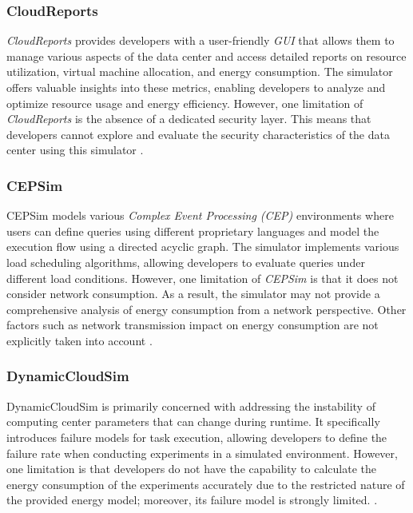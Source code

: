{\subsubsection*{CloudReports}
\emph{CloudReports} \cite{teixeira2014cloudreports} provides developers with a user-friendly \emph{GUI} that allows them to manage various aspects of the data center and access detailed reports on resource utilization, virtual machine allocation, and energy consumption. The simulator offers valuable insights into these metrics, enabling developers to analyze and optimize resource usage and energy efficiency.
However, one limitation of \emph{CloudReports} is the absence of a dedicated security layer. This means that developers cannot explore and evaluate the security characteristics of the data center using this simulator \cite{mansouri2020cloud}.
\subsubsection*{CEPSim}
CEPSim \cite{higashino2015cepsim} models various \emph{Complex Event Processing (CEP)} environments \cite{luckham1998complex} where users can define queries using different proprietary languages and model the execution flow using a directed acyclic graph. The simulator implements various load scheduling algorithms, allowing developers to evaluate queries under different load conditions. However, one limitation of \emph{CEPSim} is that it does not consider network consumption. As a result, the simulator may not provide a comprehensive analysis of energy consumption from a network perspective. Other factors such as network transmission impact on energy consumption are not explicitly taken into account \cite{mansouri2020cloud}.
\subsubsection*{DynamicCloudSim}
DynamicCloudSim \cite{bux2013dynamiccloudsim} is primarily concerned with addressing the instability of computing center parameters that can change during runtime. It specifically introduces failure models for task execution, allowing developers to define the failure rate when conducting experiments in a simulated environment. However, one limitation is that developers do not have the capability to calculate the energy consumption of the experiments accurately due to the restricted nature of the provided energy model; moreover, its failure model is strongly limited. \cite{mansouri2020cloud}. \cite{suryateja2016comparative}
}
